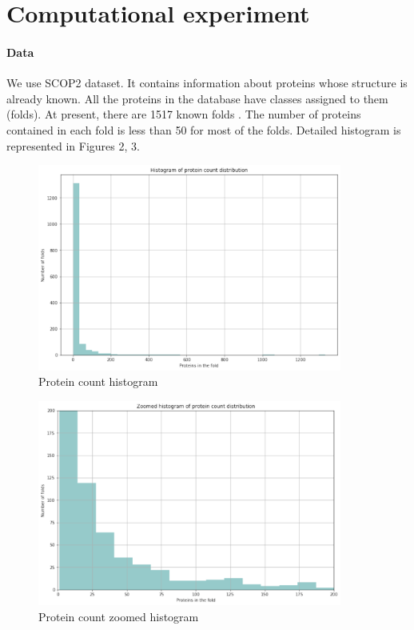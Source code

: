 \documentclass[12pt, twoside]{article}
\begin{document}
\section{Computational experiment}


\paragraph{Data}
\noindent
We use SCOP2 \cite{SCOP2FST, SCOP2SND} dataset. It contains information about proteins whose structure is already known. All the proteins in the database have classes assigned to them (folds).  At present, there are 1517 known folds \cite{SCOP2SND}. The number of proteins contained in each fold is less than 50 for most of the folds. Detailed histogram is represented in Figures 2, 3. 

\begin{figure}[htp]
    \centering
    \includegraphics[width=10cm]{figures/figure2.pdf}
    \caption{Protein count histogram}
\end{figure}

\begin{figure}[htp]
    \centering
    \includegraphics[width=10cm]{figures/figure3.pdf}
    \caption{Protein count zoomed histogram}
\end{figure}
\end{document}
